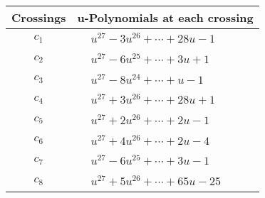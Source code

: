 \documentclass[1p]{elsarticle_modified}
\theoremstyle{definition}
\begin{document}
\begin{tabular}{m{50pt}|m{274pt}}
Crossings & \hspace{64pt}u-Polynomials at each crossing \\
\hline $$\begin{aligned}c_{1}\end{aligned}$$&$\begin{aligned}
&u^{27}-3 u^{26}+\cdots+28 u-1
\end{aligned}$\\
\hline $$\begin{aligned}c_{2}\end{aligned}$$&$\begin{aligned}
&u^{27}-6 u^{25}+\cdots+3 u+1
\end{aligned}$\\
\hline $$\begin{aligned}c_{3}\end{aligned}$$&$\begin{aligned}
&u^{27}-8 u^{24}+\cdots+u-1
\end{aligned}$\\
\hline $$\begin{aligned}c_{4}\end{aligned}$$&$\begin{aligned}
&u^{27}+3 u^{26}+\cdots+28 u+1
\end{aligned}$\\
\hline $$\begin{aligned}c_{5}\end{aligned}$$&$\begin{aligned}
&u^{27}+2 u^{26}+\cdots+2 u-1
\end{aligned}$\\
\hline $$\begin{aligned}c_{6}\end{aligned}$$&$\begin{aligned}
&u^{27}+4 u^{26}+\cdots+2 u-4
\end{aligned}$\\
\hline $$\begin{aligned}c_{7}\end{aligned}$$&$\begin{aligned}
&u^{27}-6 u^{25}+\cdots+3 u-1
\end{aligned}$\\
\hline $$\begin{aligned}c_{8}\end{aligned}$$&$\begin{aligned}
&u^{27}+5 u^{26}+\cdots+65 u-25
\end{aligned}$\\

\end{tabular}
\end{document}
